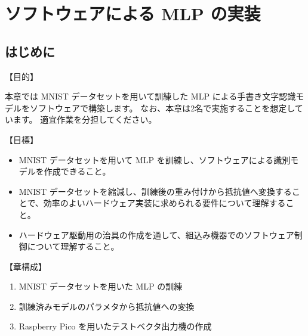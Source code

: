 \chapter{ソフトウェアによる MLP の実装}

\section{はじめに}

【目的】

本章では MNIST データセットを用いて訓練した MLP による手書き文字認識モデルをソフトウェアで構築します。
なお、本章は2名で実施することを想定しています。
適宜作業を分担してください。

【目標】

\begin{itemize}
    \item MNIST データセットを用いて MLP を訓練し、ソフトウェアによる識別モデルを作成できること。
    \item MNIST データセットを縮減し、訓練後の重み付けから抵抗値へ変換することで、効率のよいハードウェア実装に求められる要件について理解すること。
    \item ハードウェア駆動用の治具の作成を通して、組込み機器でのソフトウェア制御について理解すること。
\end{itemize}

【章構成】

\begin{enumerate}
    \item MNIST データセットを用いた MLP の訓練
    \item 訓練済みモデルのパラメタから抵抗値への変換
    \item Raspberry Pico を用いたテストベクタ出力機の作成
\end{enumerate}